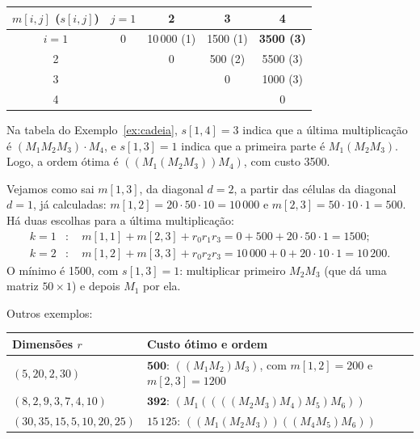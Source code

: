 \begin{center}\small
\begin{tabular}{c|cccc}
$m[i,j]$ ($s[i,j]$) & $j=1$ & 2 & 3 & 4\\ \hline
$i=1$ & 0 & 10\,000 (1) & 1500 (1) & \textbf{3500 (3)}\\
2 & & 0 & 500 (2) & 5500 (3)\\
3 & & & 0 & 1000 (3)\\
4 & & & & 0
\end{tabular}
\end{center}
Na tabela do Exemplo~\ref{ex:cadeia}, $s[1,4]=3$ indica que a última multiplicação é $(M_1M_2M_3)\cdot M_4$, e $s[1,3]=1$ indica que a primeira parte é $M_1(M_2M_3)$. Logo, a ordem ótima é $((M_1(M_2M_3))M_4)$, com custo 3500.

\begin{exemplo}
Vejamos como sai $m[1,3]$, da diagonal $d=2$, a partir das células da diagonal $d=1$, já calculadas: $m[1,2]=20\cdot50\cdot10=10\,000$ e $m[2,3]=50\cdot10\cdot1=500$. Há duas escolhas para a última multiplicação:
\begin{align*}
k=1&:\quad m[1,1]+m[2,3]+r_0r_1r_3=0+500+20\cdot50\cdot1=1500;\\
k=2&:\quad m[1,2]+m[3,3]+r_0r_2r_3=10\,000+0+20\cdot10\cdot1=10\,200.
\end{align*}
O mínimo é 1500, com $s[1,3]=1$: multiplicar primeiro $M_2M_3$ (que dá uma matriz $50\times1$) e depois $M_1$ por ela.
\end{exemplo}

Outros exemplos:
\begin{center}\small
\begin{tabularx}{\linewidth}{@{}>{\raggedright\arraybackslash}p{4.2cm}X@{}}
\toprule
Dimensões $r$ & Custo ótimo e ordem\\
\midrule
$(5,20,2,30)$ & $\mathbf{500}$: $((M_1M_2)M_3)$, com $m[1,2]=200$ e $m[2,3]=1200$\\
$(8,2,9,3,7,4,10)$ & $\mathbf{392}$: $(M_1((((M_2M_3)M_4)M_5)M_6))$\\
$(30,35,15,5,10,20,25)$ & $15\,125$: $((M_1(M_2M_3))((M_4M_5)M_6))$\\
\bottomrule
\end{tabularx}
\end{center}

